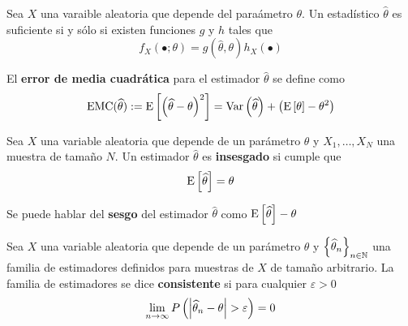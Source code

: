 \begin{teorema}
Sea $X$ una varaible aleatoria que depende del paraámetro $\theta$. Un estadístico $\widehat{\theta}$ es suficiente si y sólo si existen funciones $g$ y $h$ tales que
\begin{equation}
f_X(\bullet; \theta ) = g(\widehat{\theta},\theta) h_X(\bullet)
\end{equation}
\end{teorema}




\begin{definicion}
El \textbf{error de media cuadrática} para el estimador $\widehat{\theta}$ se define como
\begin{equation}
\text{EMC}(\widehat{\theta}) := \mathrm{E}\left[ \left( \widehat{\theta} - \theta \right)^{2} \right] =
\mathrm{Var}\left( \widehat{\theta} \right) + \left( \mathrm{E}\left[ \theta \right] - \theta^{2} \right)
\end{equation}
\end{definicion}

\begin{definicion}
Sea $X$ una variable aleatoria que depende de un parámetro $\theta$ y $X_1, \dots, X_N$ una muestra de tamaño $N$. Un estimador $\widehat{\theta}$ es \textbf{insesgado} si cumple que
\begin{equation}
\mathrm{E}\left[ \widehat{\theta} \right] = \theta
\end{equation}
\end{definicion}

Se puede hablar del \textbf{sesgo} del estimador $\widehat{\theta}$ como $\mathrm{E}\left[ \widehat{\theta} \right]-\theta$

\begin{definicion}
Sea $X$ una variable aleatoria que depende de un parámetro $\theta$ y $\left\{ \widehat{\theta}_n \right\}_{n\in \mathbb{N}}$ una familia de estimadores definidos para muestras de $X$ de tamaño arbitrario. La familia de estimadores se dice \textbf{consistente} si para cualquier $\varepsilon > 0$
\begin{equation}
\lim_{n\rightarrow\infty} P\left( \left| \widehat{\theta}_n-\theta \right| > \varepsilon \right) = 0
\end{equation}
\end{definicion}


